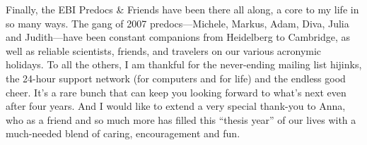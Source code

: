 \begin{acknowledgements}
Finally, the EBI Predocs \& Friends have been there all along, a core
to my life in so many ways. The gang of 2007 predocs---Michele,
Markus, Adam, Diva, Julia and Judith---have been constant companions
from Heidelberg to Cambridge, as well as reliable scientists, friends,
and travelers on our various acronymic holidays. To all the others, I
am thankful for the never-ending mailing list hijinks, the 24-hour
support network (for computers and for life) and the endless good
cheer. It's a rare bunch that can keep you looking forward to what's
next even after four years. And I would like to extend a very special
thank-you to Anna, who as a friend and so much more has filled this
``thesis year'' of our lives with a much-needed blend of caring,
encouragement and fun.

\end{acknowledgements}
